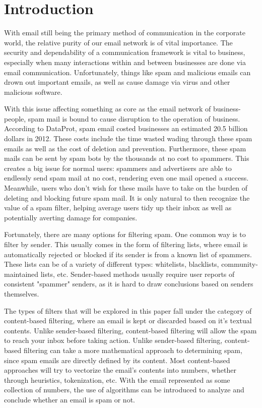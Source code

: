\documentclass{article}
\begin{document}
\section{Introduction}
\begin{paragraph}
With email still being the primary method of communication in the corporate world, the relative purity of our email network is of vital importance. The security and dependability of a communication framework is vital to business, especially when many interactions within and between businesses are done via email communication. Unfortunately, things like spam and malicious emails can drown out important emails, as well as cause damage via virus and other malicious software. 
\end{paragraph}
\begin{paragraph}
With this issue affecting something as core as the email network of business-people, spam mail is bound to cause disruption to the operation of business. According to DataProt, spam email costed businesses an estimated 20.5 billion dollars in 2012. 
\cite{budanovic_letic_jovanovic_2020}
These costs include the time wasted wading through these spam emails as well as the cost of deletion and prevention. Furthermore, these spam mails can be sent by spam bots by the thousands at no cost to spammers. This creates a big issue for normal users: spammers and advertisers are able to endlessly send spam mail at no cost, rendering even one mail opened a success. Meanwhile, users who don't wish for these mails have to take on the burden of deleting and blocking future spam mail. It is only natural to then recognize the value of a spam filter, helping average users tidy up their inbox as well as potentially averting damage for companies.
\end{paragraph}
\begin{paragraph}
Fortunately, there are many options for filtering spam. One common way is to filter by sender. This usually comes in the form of filtering lists, where email is automatically rejected or blocked if its sender is from a known list of spammers. These lists can be of a variety of different types: whitelists, blacklists, community-maintained lists, etc. Sender-based methods usually require user reports of consistent "spammer" senders, as it is hard to draw conclusions based on senders themselves.
\end{paragraph}
\begin{paragraph}
The types of filters that will be explored in this paper fall under the category of content-based filtering, where an email is kept or discarded based on it's textual contents. Unlike sender-based filtering, content-based filtering will allow the spam to reach your inbox before taking action. Unlike sender-based filtering, content-based filtering can take a more mathematical approach to determining spam, since spam emails are directly defined by its content. Most content-based approaches will try to vectorize the email's contents into numbers, whether through heuristics, tokenization, etc. With the email represented as some collection of numbers, the use of algorithms can be introduced to analyze and conclude whether an email is spam or not.
\end{paragraph}
\end{document}
